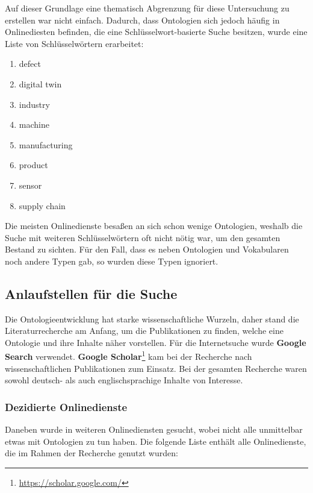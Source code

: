 \documentclass{article}
\begin{document}
Auf dieser Grundlage eine thematisch Abgrenzung für diese Untersuchung zu erstellen war nicht einfach.
Dadurch, dass Ontologien sich jedoch häufig in Onlinediesten befinden, die eine Schlüsselwort-basierte Suche besitzen, wurde eine Liste von Schlüsselwörtern erarbeitet:

\begin{enumerate}
    \item defect
    \item digital twin
    \item industry
    \item machine
    \item manufacturing
    \item product
    \item sensor
    \item supply chain
\end{enumerate}

Die meisten Onlinedienste besaßen an sich schon wenige Ontologien, weshalb die Suche mit weiteren Schlüsselwörtern oft nicht nötig war, um den gesamten Bestand zu sichten.
Für den Fall, dass es neben Ontologien und Vokabularen noch andere Typen gab, so wurden diese Typen ignoriert.

\subsection{Anlaufstellen für die Suche}

Die Ontologieentwicklung hat starke wissenschaftliche Wurzeln, daher stand die Literaturrecherche am Anfang, um die Publikationen zu finden, welche eine Ontologie und ihre Inhalte näher vorstellen.
Für die Internetsuche wurde \textbf{Google Search} verwendet.
\textbf{Google Scholar}\footnote{\url{https://scholar.google.com/}} kam bei der Recherche nach wissenschaftlichen Publikationen zum Einsatz.
Bei der gesamten Recherche waren sowohl deutsch- als auch englischsprachige Inhalte von Interesse.

\subsubsection{Dezidierte Onlinedienste}

Daneben wurde in weiteren Onlinediensten gesucht, wobei nicht alle unmittelbar etwas mit Ontologien zu tun haben.
Die folgende Liste enthält alle Onlinedienste, die im Rahmen der Recherche genutzt wurden:
\end{document}
